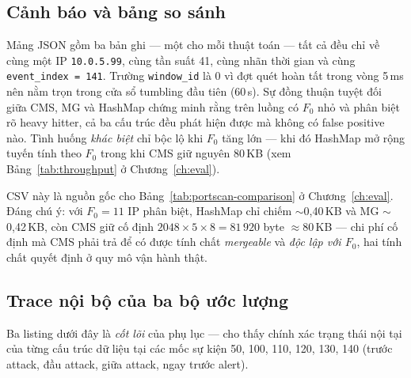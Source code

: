 \subsection{Cảnh báo và bảng so sánh}
\label{sec:trace:portscan-alerts}



\noindent Mảng JSON gồm ba bản ghi --- một cho mỗi thuật toán --- tất cả đều
chỉ về cùng một IP \texttt{10.0.5.99}, cùng tần suất 41, cùng nhãn thời gian
và cùng \texttt{event\_index = 141}. Trường \texttt{window\_id} là 0 vì đợt
quét hoàn tất trong vòng 5\,ms nên nằm trọn trong cửa sổ tumbling đầu tiên
(60\,s). Sự đồng thuận tuyệt đối giữa CMS, MG và HashMap chứng minh rằng
trên luồng có $F_0$ nhỏ và phân biệt rõ heavy hitter, cả ba cấu trúc đều
phát hiện được mà không có false positive nào. Tình huống \emph{khác biệt}
chỉ bộc lộ khi $F_0$ tăng lớn --- khi đó HashMap mở rộng tuyến tính theo
$F_0$ trong khi CMS giữ nguyên 80\,KB (xem Bảng~\ref{tab:throughput} ở
Chương~\ref{ch:eval}).



\noindent CSV này là nguồn gốc cho Bảng~\ref{tab:portscan-comparison} ở
Chương~\ref{ch:eval}. Đáng chú ý: với $F_0 = 11$ IP phân biệt, HashMap chỉ
chiếm $\sim$0{,}40\,KB và MG $\sim$0{,}42\,KB, còn CMS giữ cố định
$2048 \times 5 \times 8 = 81\,920$ byte $\approx 80$\,KB --- chi phí cố định
mà CMS phải trả để có được tính chất \emph{mergeable} và \emph{độc lập với
$F_0$}, hai tính chất quyết định ở quy mô vận hành thật.

\subsection{Trace nội bộ của ba bộ ước lượng}
\label{sec:trace:portscan-internal}

Ba listing dưới đây là \emph{cốt lõi} của phụ lục --- cho thấy chính xác
trạng thái nội tại của từng cấu trúc dữ liệu tại các mốc sự kiện
50, 100, 110, 120, 130, 140 (trước attack, đầu attack, giữa attack, ngay
trước alert).



